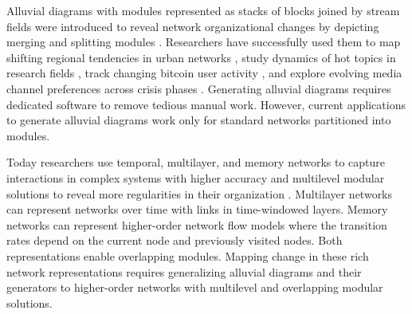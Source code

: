 \documentclass[aps,rmp,floats,floatfix,twocolumn,superscriptaddress,final]{revtex4-2}
\begin{document}
Alluvial diagrams with modules represented as stacks of blocks joined by stream fields were introduced to reveal network organizational changes by depicting merging and splitting modules \cite{rosvall2010mapping}.
Researchers have successfully used them to map shifting regional tendencies in urban networks \cite{liu2013featured}, study dynamics of hot topics in research fields \cite{ruan2017detecting,pal2022predicting}, track changing bitcoin user activity \cite{remy2017tracking}, and explore evolving media channel preferences across crisis phases \cite{petrun2021disasters}.
Generating alluvial diagrams requires dedicated software to remove tedious manual work. 
However, current applications to generate alluvial diagrams work only for standard networks partitioned into modules.

Today researchers use temporal, multilayer, and memory networks to capture interactions in complex systems with higher accuracy \cite{kivela2014multilayer,rosvall2014memory,de2015identifying,de2016physics,xu2016representing,lambiotte2019networks} and multilevel modular solutions to reveal more regularities in their organization \cite{rosvall2011multilevel,peixoto2014hierarchical}.
Multilayer networks can represent networks over time with links in time-windowed layers.
Memory networks can represent higher-order network flow models where the transition rates depend on the current node and previously visited nodes. Both representations enable overlapping modules.
Mapping change in these rich network representations requires generalizing alluvial diagrams and their generators to higher-order networks with multilevel and overlapping modular solutions.
\end{document}
